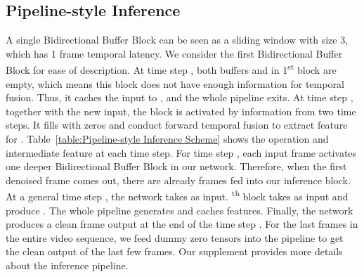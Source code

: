 \documentclass[sigconf]{acmart}
\newcommand{\ts}{\textsuperscript}
\begin{document}
\subsection{Pipeline-style Inference}
\label{section:Pipeline-style Inference Scheme}
\begin{table}[t]
\small
\centering
\renewcommand{\arraystretch}{1.2}
\caption{\small{Pipeline-Style inference at different time step.}\vspace{-5pt}}
\label{table:Pipeline-style Inference Scheme}
\vspace{-1em}
\end{table}
 A single Bidirectional Buffer Block can be seen as a sliding window with size 3, which has 1 frame temporal latency. 
 We consider the first Bidirectional Buffer Block for ease of description.
 At time step , both buffers  and  in 1\ts{st} block are empty, which means this block does not have enough information for temporal fusion. Thus, it caches the input  to , and the whole pipeline exits. At time step , together with the new input, the block is activated by information from two time steps. It fills  with zeros and conduct forward temporal fusion to extract feature  for .
 Table~\ref{table:Pipeline-style Inference Scheme} shows the operation and intermediate feature at each time step.
 For time step , each input frame activates one deeper Bidirectional Buffer Block  in our network. 
Therefore, when the first denoised frame  comes out, there are already  frames fed into our inference block. At a general time step , the network takes  as input. \ts{th} block takes  as input and produce .
The whole pipeline generates and caches  features. 
Finally, the network produces a clean frame output  at the end of the time step .
For the last  frames in the entire video sequence, we feed dummy zero tensors into the pipeline to get the clean output of the last few frames. Our supplement provides more details about the inference pipeline.
\end{document}
